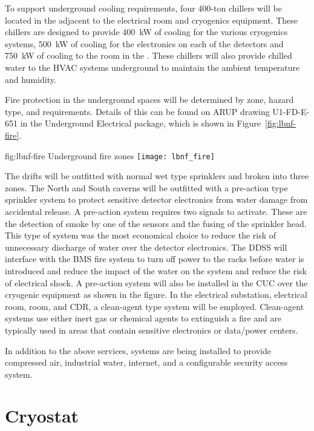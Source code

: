 To support underground cooling requirements, four 400-ton chillers
will be located in the  adjacent to the electrical room and
cryogenics equipment.  These chillers are designed to provide
\SI{400}{\kilo\watt} of cooling for the various cryogenics systems,
\SI{500}{\kilo\watt} of cooling for the electronics on each of the
detectors and \SI{750}{\kilo\watt} of cooling to the  room
in the .  These chillers will also provide chilled water to
the HVAC systems underground to maintain the ambient temperature and
humidity.

Fire protection in the underground spaces will be determined by zone,
hazard type, and requirements.  Details of this can be found on ARUP
drawing U1-FD-E-651 in the Underground Electrical package, which is shown
in Figure~\ref{fig:lbnf-fire}.
\begin{dunefigure}{fig:lbnf-fire}
  {Underground fire zones}
 \texttt{[image: lbnf\_fire]}
\end{dunefigure}
The drifts will be outfitted with normal wet type sprinklers and
broken into three zones.  The North and South caverns will be outfitted
with a pre-action type sprinkler system to protect sensitive detector
electronics from water damage from accidental release.  A pre-action
system requires two signals to activate.  These are the detection of
smoke by one of the sensors and the fusing of the sprinkler
head.  This type of system was the most economical choice to reduce the
risk of unnecessary discharge of water over the detector electronics.
The DDSS will interface with the BMS fire system to turn off power
to the racks before water is introduced and reduce the impact of
the water on the system and reduce the risk of electrical shock.  A
pre-action system will also be installed in the CUC over the cryogenic
equipment as shown in the figure.  In the electrical substation,
electrical room,  room, and CDR, a clean-agent type system will be
employed.  Clean-agent systems use either inert gas or chemical agents
to extinguish a fire and are typically used in areas that contain
sensitive electronics or data/power centers.

In addition to the above services, systems are being installed to
provide compressed air, industrial water, internet, and a configurable
security access system.

\section{Cryostat}
\label{sec:fdsp-coord-cryostat}


